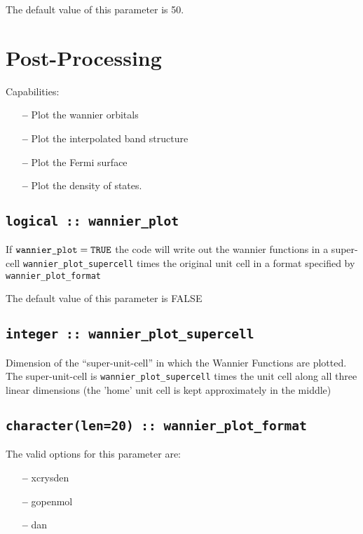 The default value of this parameter is 50.




\section{Post-Processing}

 Capabilities:

\begin{itemize}
\item[{\bf --}]  Plot the wannier orbitals			     
\item[{\bf --}]  Plot the interpolated band structure 		     
\item[{\bf --}]  Plot the Fermi surface 			     
\item[{\bf --}]  Plot the density of states.
\end{itemize}


\subsection[wannier\_plot]{\tt logical :: wannier\_plot}

If $\verb#wannier_plot#=\verb#TRUE#$ the code will write out the
wannier functions in a super-cell \verb#wannier_plot_supercell# times
the original unit cell in a format specified by \verb#wannier_plot_format#

The default value of this parameter is FALSE

\subsection[wannier\_plot\_supercell]{\tt integer :: wannier\_plot\_supercell}

Dimension of the ``super-unit-cell'' in which the Wannier Functions are plotted.
     The super-unit-cell is \verb#wannier_plot_supercell# times the unit cell along all three
     linear dimensions (the 'home' unit cell is kept approximately
     in the middle)


\subsection[wannier\_plot\_format]{\tt character(len=20) :: wannier\_plot\_format}

The valid options for this parameter are:
\begin{itemize}
\item[{\bf --}] xcrysden
\item[{\bf --}] gopenmol
\item[{\bf --}] dan
\end{itemize}


